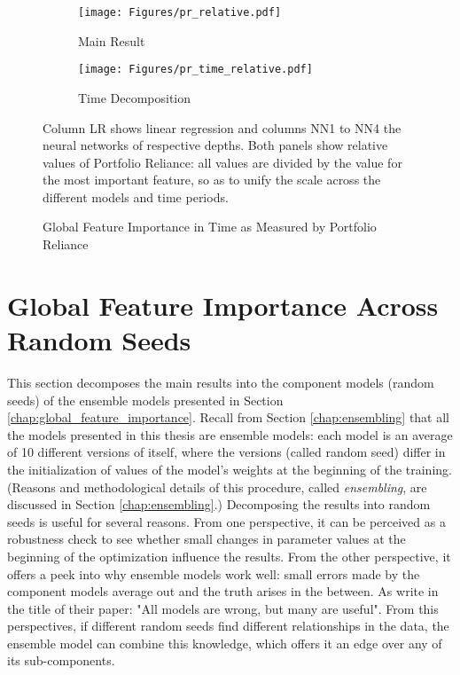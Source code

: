 	\begin{figure}	
		\centering		
		\begin{subfigure}[t]{\textwidth}
			\texttt{[image: Figures/pr\_relative.pdf]}
			\caption{Main Result}
			\label{fig:pr_time_main}
		\end{subfigure}
		
		\begin{subfigure}[t]{\textwidth}
			\centering
			\texttt{[image: Figures/pr\_time\_relative.pdf]}
			\caption{Time Decomposition}
			\label{fig:pr_time_relative}
		\end{subfigure}
		\caption{Global Feature Importance in Time as Measured by Portfolio Reliance}
		\label{fig:pr_time}
		\medskip
		\small
		Column LR shows linear regression and columns NN1 to NN4 the neural networks of respective depths. Both panels show relative values of Portfolio Reliance: all values are divided by the value for the most important feature, so as to unify the scale across the different models and time periods. 
	\end{figure}

\section{Global Feature Importance Across Random Seeds}

	This section decomposes the main results into the component models (random seeds) of the ensemble models presented in Section \ref{chap:global_feature_importance}. Recall from Section \ref{chap:ensembling} that all the models presented in this thesis are ensemble models: each model is an average of 10 different versions of itself, where the versions (called random seed) differ in the initialization of values of the model's weights at the beginning of the training. (Reasons and methodological details of this procedure, called \textit{ensembling}, are discussed in Section \ref{chap:ensembling}.) Decomposing the results into random seeds is useful for several reasons. From one perspective, it can be perceived as a robustness check to see whether small changes in parameter values at the beginning of the optimization influence the results. From the other perspective, it offers a peek into why ensemble models work well: small errors made by the component models average out and the truth arises in the between. As \cite{fisher2019all} write in the title of their paper: "All models are wrong, but many are useful". From this perspectives, if different random seeds find different relationships in the data, the ensemble model can combine this knowledge, which offers it an edge over any of its sub-components. 
	
